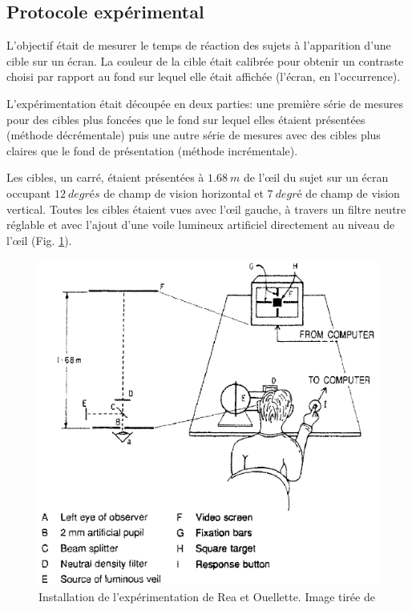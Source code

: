 	\subsection{Protocole expérimental}
	\par L'objectif était de mesurer le temps de réaction des sujets à l'apparition d'une cible sur un écran. La couleur de la cible était calibrée pour obtenir un contraste choisi par rapport au fond sur lequel elle était affichée (l'écran, en l'occurrence).
	
	\par L'expérimentation était découpée en deux parties: une première série de mesures pour des cibles plus foncées que le fond sur lequel elles étaient présentées (méthode décrémentale) puis une autre série de mesures avec des cibles plus claires que le fond de présentation (méthode incrémentale).
	
	\par Les cibles, un carré, étaient présentées à $1.68~m$ de l'œil du sujet sur un écran occupant $12~degrés$ de champ de vision horizontal et $7~degré$ de champ de vision vertical. Toutes les cibles étaient vues avec l'œil gauche, à travers un filtre neutre réglable et avec l'ajout d'une voile lumineux artificiel directement au niveau de l'œil (Fig. \ref{fig:rea_apparatus}).
	
	\begin{figure}
		\centering
		\includegraphics[scale=.75]{Figures/ReactionTimeApparatus}
		\caption{Installation de l'expérimentation de Rea et Ouellette. Image tirée de \citep{rea_visual_1988}}
		\label{fig:rea_apparatus}
	\end{figure}
	
